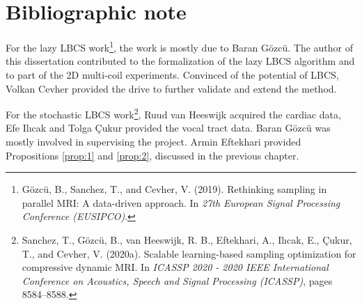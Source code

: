 

    
\section*{Bibliographic note}
For the lazy LBCS work\footnote{G{\"o}zc{\"u}, B., Sanchez, T., and Cevher, V. (2019). Rethinking sampling in parallel MRI: A data-driven approach. In \textit{27th European Signal Processing Conference (EUSIPCO)}.}, the work is mostly due to Baran G{\"o}zc{\"u}. The author of this dissertation contributed to the formalization of the lazy LBCS algorithm and to part of the 2D multi-coil experiments. Convinced of the potential of LBCS, Volkan Cevher provided the drive to further validate and extend the method.

For the stochastic LBCS work\footnote{Sanchez, T., G{\"o}zc{\"u}, B., van Heeswijk, R. B., Eftekhari, A., Il{\i}cak, E., \c{C}ukur, T., and Cevher, V. (2020a). Scalable learning-based sampling optimization for compressive dynamic MRI. In \textit{ICASSP 2020 - 2020 IEEE International Conference on Acoustics, Speech and Signal Processing (ICASSP)}, pages 8584–8588.}, Ruud van Heeswijk acquired the cardiac data, Efe Il{\i}cak and Tolga \c{C}ukur provided the vocal tract data. Baran G{\"o}zc{\"u} was mostly involved in supervising the project. Armin Eftekhari provided Propositions \ref{prop:1} and \ref{prop:2}, discussed in the previous chapter. 
